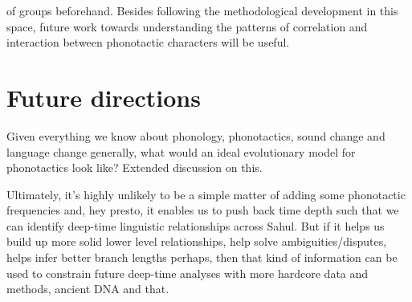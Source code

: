 of groups beforehand. Besides following the methodological development in this space, future work towards understanding the patterns of correlation and interaction between phonotactic characters will be useful.

\hypertarget{future-directions}{%
\section{Future directions}\label{future-directions}}

Given everything we know about phonology, phonotactics, sound change and language change generally, what would an ideal evolutionary model for phonotactics look like? Extended discussion on this.

Ultimately, it's highly unlikely to be a simple matter of adding some phonotactic frequencies and, hey presto, it enables us to push back time depth such that we can identify deep-time linguistic relationships across Sahul. But if it helps us build up more solid lower level relationships, help solve ambiguities/disputes, helps infer better branch lengths perhaps, then that kind of information can be used to constrain future deep-time analyses with more hardcore data and methods, ancient DNA and that.
